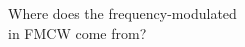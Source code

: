 \documentclass[preview]{standalone}
\begin{document}
\begin{center}
Where does the frequency-modulated\\in FMCW come from?
\end{center}
\end{document}
